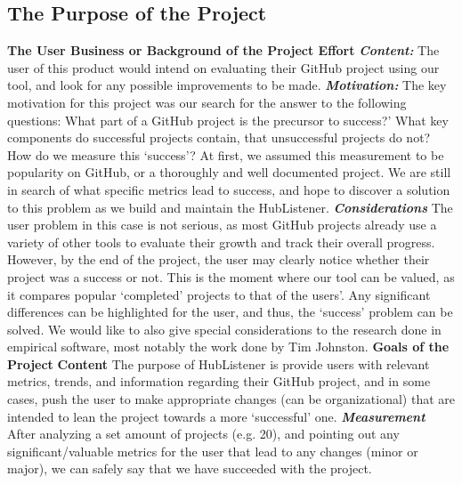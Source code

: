 \documentclass{article}
\begin{document}
\subsection{The Purpose of the Project}
\textbf{The User Business or Background of the Project Effort}
\newline
\textbf{\textit{Content:}} The user of this product would intend on evaluating their GitHub project using our tool, and look for any possible improvements to be made. \newline
\textbf{\textit{Motivation:}}\newline
The key motivation for this project was our search for the answer to the following questions: What part of a GitHub project is the precursor to success?' What key components do successful projects contain, that unsuccessful projects do not? How do we measure this ‘success’? At first, we assumed this measurement to be popularity on GitHub, or a thoroughly and well documented project. We are still in search of what specific metrics lead to success, and hope to discover a solution to this problem as we build and maintain the HubListener. \newline
\textbf{\textit{Considerations}}
The user problem in this case is not serious, as most GitHub projects already use a variety of other tools to evaluate their growth and track their overall progress. However, by the end of the project, the user may clearly notice whether their project was a success or not. This is the moment where our tool can be valued, as it compares popular ‘completed’ projects to that of the users’. Any significant differences can be highlighted for the user, and thus, the ‘success’ problem can be solved. We would like to also give special considerations to the research done in empirical software, most notably the work done by Tim Johnston. \cite{johnston2016toolkit} \newline
\newline
\textbf{Goals of the Project}
\textbf{Content}\newline
The purpose of HubListener is provide users with relevant metrics, trends, and information regarding their GitHub project, and in some cases, push the user to make appropriate changes (can be organizational) that are intended to lean the project towards a more ‘successful’ one.\newline
\textbf{\textit{Measurement}}
After analyzing a set amount of projects (e.g. 20), and pointing out any significant/valuable metrics for the user that lead to any changes (minor or major), we can safely say that we have succeeded with the project.
\end{document}
